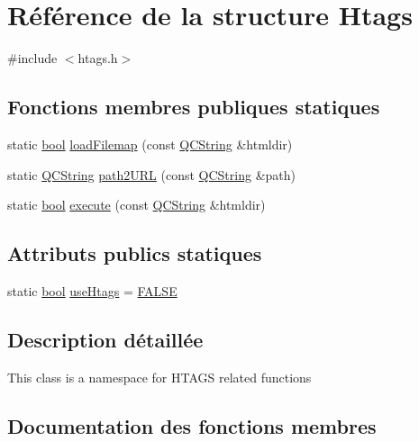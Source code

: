 \hypertarget{struct_htags}{}\section{Référence de la structure Htags}
\label{struct_htags}


{\ttfamily \#include $<$htags.\+h$>$}

\subsection*{Fonctions membres publiques statiques}
\begin{DoxyCompactItemize}
\item 
static \hyperlink{qglobal_8h_a1062901a7428fdd9c7f180f5e01ea056}{bool} \hyperlink{struct_htags_a91a5a1322fbff8f8ad136a3372964512}{load\+Filemap} (const \hyperlink{class_q_c_string}{Q\+C\+String} \&htmldir)
\item 
static \hyperlink{class_q_c_string}{Q\+C\+String} \hyperlink{struct_htags_a0ce955dfddd8473bce6373e92532f12e}{path2\+U\+R\+L} (const \hyperlink{class_q_c_string}{Q\+C\+String} \&path)
\item 
static \hyperlink{qglobal_8h_a1062901a7428fdd9c7f180f5e01ea056}{bool} \hyperlink{struct_htags_a459ba4c5a4e6d3308cee25b93448f0cf}{execute} (const \hyperlink{class_q_c_string}{Q\+C\+String} \&htmldir)
\end{DoxyCompactItemize}
\subsection*{Attributs publics statiques}
\begin{DoxyCompactItemize}
\item 
static \hyperlink{qglobal_8h_a1062901a7428fdd9c7f180f5e01ea056}{bool} \hyperlink{struct_htags_af3f32647c4c570264405de97f51cad05}{use\+Htags} = \hyperlink{qglobal_8h_a10e004b6916e78ff4ea8379be80b80cc}{F\+A\+L\+S\+E}
\end{DoxyCompactItemize}


\subsection{Description détaillée}
This class is a namespace for H\+T\+A\+G\+S related functions 

\subsection{Documentation des fonctions membres}
\hypertarget{struct_htags_a459ba4c5a4e6d3308cee25b93448f0cf}{}
